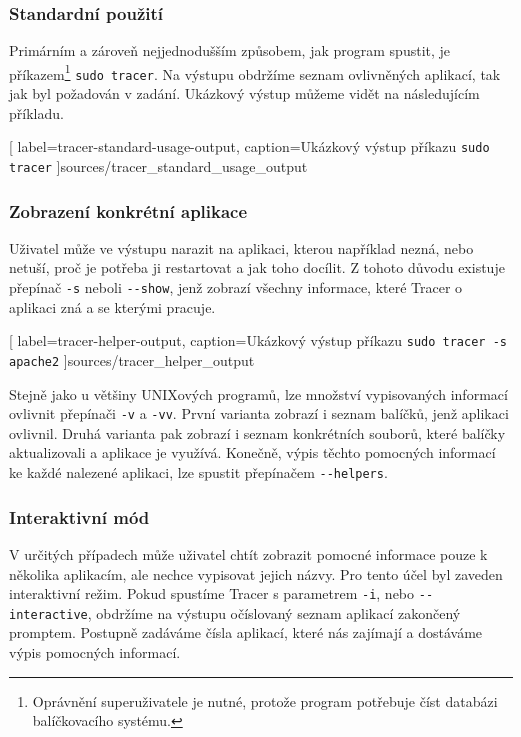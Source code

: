 \documentclass[10pt,a4paper]{article}
\begin{document}
			\subsubsection{Standardní použití}
			Primárním a zároveň nejjednodušším způsobem, jak program spustit, je příkazem\footnote{Oprávnění superuživatele je nutné, protože program potřebuje číst databázi balíčkovacího systému.} \texttt{sudo tracer}. Na výstupu obdržíme seznam ovlivněných aplikací, tak jak byl požadován v zadání. Ukázkový výstup můžeme vidět na následujícím příkladu.

			
			[
				label=tracer-standard-usage-output,
				caption={Ukázkový výstup příkazu \texttt{sudo tracer}}
			]{sources/tracer_standard_usage_output}

			\pagebreak
			\subsubsection{Zobrazení konkrétní aplikace}
			Uživatel může ve výstupu narazit na aplikaci, kterou například nezná, nebo netuší, proč je potřeba ji restartovat a jak toho docílit. Z tohoto důvodu existuje přepínač \texttt{-s} neboli \texttt{-{}-show}, jenž zobrazí všechny informace, které Tracer o aplikaci zná a se kterými pracuje.

			
			[
				label=tracer-helper-output,
				caption={Ukázkový výstup příkazu \texttt{sudo tracer -s apache2}}
			]{sources/tracer_helper_output}

			Stejně jako u většiny UNIXových programů, lze množství vypisovaných informací ovlivnit přepínači \texttt{-v} a \texttt{-vv}. První varianta zobrazí i seznam balíčků, jenž aplikaci ovlivnil. Druhá varianta pak zobrazí i seznam konkrétních souborů, které balíčky aktualizovali a aplikace je využívá. Konečně, výpis těchto pomocných informací ke každé nalezené aplikaci, lze spustit přepínačem \texttt{-{}-helpers}.

			\subsubsection{Interaktivní mód}
			V určitých případech může uživatel chtít zobrazit pomocné informace pouze k několika aplikacím, ale nechce vypisovat jejich názvy. Pro tento účel byl zaveden interaktivní režim. Pokud spustíme Tracer s parametrem \texttt{-i}, nebo \texttt{-{}-interactive}, obdržíme na výstupu očíslovaný seznam aplikací zakončený promptem. Postupně zadáváme čísla aplikací, které nás zajímají a dostáváme výpis pomocných informací.
\end{document}

